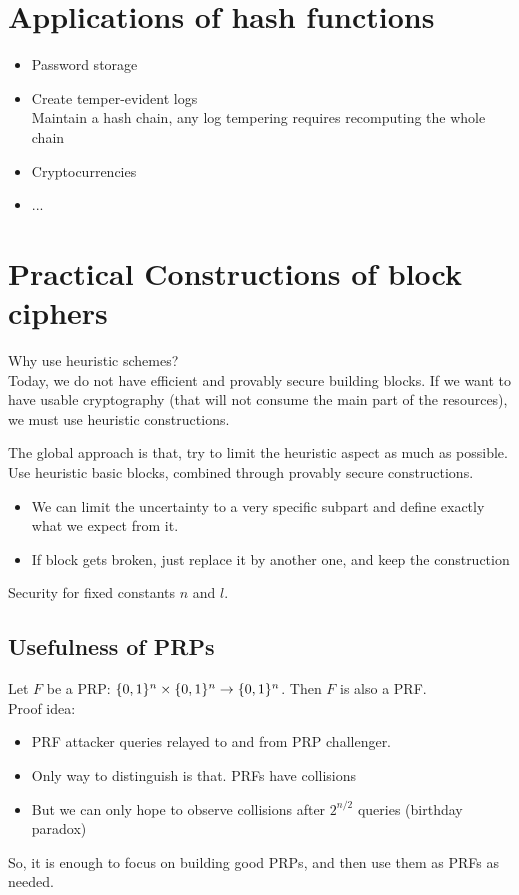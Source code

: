 \documentclass[12pt]{article}
\begin{document}
\section{Applications of hash functions}
\begin{itemize}
\item Password storage
\item Create temper-evident logs\\
Maintain a hash chain, any log tempering requires recomputing the whole chain
\item Cryptocurrencies
\item ...
\end{itemize}
\newpage

\section{Practical Constructions of block ciphers}
Why use heuristic schemes?\\
Today, we do not have efficient and provably secure building blocks. If we want to have usable cryptography (that will not consume the main part of the resources), we must use heuristic constructions.

The global approach is that, try to limit the heuristic aspect as much as possible. Use heuristic basic blocks, combined through provably secure constructions.
\begin{itemize}
\item We can limit the uncertainty to a very specific subpart and define exactly what we expect from it.
\item If block gets broken, just replace it by another one, and keep the construction
\end{itemize}

Security for fixed constants $n$ and $l$.

\subsection{Usefulness of PRPs}
Let $F$ be a PRP: $\{0, 1\}^n \times \{0, 1\}^n \rightarrow \{0, 1\}^n$. Then $F$ is also a PRF. \\
Proof idea:
\begin{itemize}
\item PRF attacker queries relayed to and from PRP challenger.
\item Only way to distinguish is that. PRFs have collisions
\item But we can only hope to observe collisions after $2^{n/2}$ queries (birthday paradox)
\end{itemize}
So, it is enough to focus on building good PRPs, and then use them as PRFs as needed.
\end{document}
